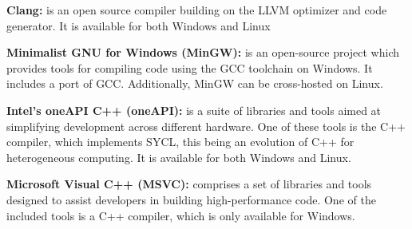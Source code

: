 
\noindent\textbf{Clang:} is an open source compiler building on the LLVM optimizer and code generator. It is available for both Windows and Linux\cite{clang}\newline

\noindent\textbf{Minimalist GNU for Windows (MinGW):} is an open-source project which provides tools for compiling code using the GCC toolchain on Windows. It includes a port of GCC. Additionally, MinGW can be cross-hosted on Linux.\cite{mingw}\newline

\noindent\textbf{Intel's oneAPI C++ (oneAPI):} is a suite of libraries and tools aimed at simplifying development across different hardware. One of these tools is the C++ compiler, which implements SYCL, this being an evolution of C++ for heterogeneous computing. It is available for both Windows and Linux.\cite{oneapi}\newline

\noindent\textbf{Microsoft Visual C++ (MSVC):}  comprises a set of libraries and tools designed to assist developers in building high-performance code. One of the included tools is a C++ compiler, which is only available for Windows\cite{msvc}.\newline